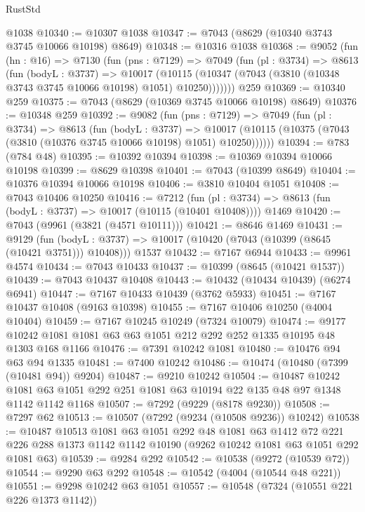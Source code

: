 \begin{lexlean}{RustStd}
\begin{coremodule}
    @1038
@10340 := @10307 @1038
@10347 := @7043 (@8629 (@10340 @3743 @3745 @10066 @10198) @8649)
@10348 := @10316 @1038
@10368 := @9052
    (fun (hn : @16) =>
    @7130
      (fun (pns : @7129) =>
      @7049
        (fun (pl : @3734) =>
        @8613
          (fun (bodyL : @3737) =>
          @10017
            (@10115 (@10347 (@7043 (@3810 (@10348 @3743 @3745 @10066 @10198) @1051) @10250)))))))
    @259
@10369 := @10340 @259
@10375 := @7043 (@8629 (@10369 @3745 @10066 @10198) @8649)
@10376 := @10348 @259
@10392 := @9082
    (fun (pns : @7129) =>
    @7049
      (fun (pl : @3734) =>
      @8613
        (fun (bodyL : @3737) =>
        @10017 (@10115 (@10375 (@7043 (@3810 (@10376 @3745 @10066 @10198) @1051) @10250))))))
@10394 := @783 (@784 @48)
@10395 := @10392 @10394
@10398 := @10369 @10394 @10066 @10198
@10399 := @8629 @10398
@10401 := @7043 (@10399 @8649)
@10404 := @10376 @10394 @10066 @10198
@10406 := @3810 @10404 @1051
@10408 := @7043 @10406 @10250
@10416 := @7212
    (fun (pl : @3734) => @8613 (fun (bodyL : @3737) => @10017 (@10115 (@10401 @10408))))
    @1469
@10420 := @7043 (@9961 (@3821 (@4571 @10111)))
@10421 := @8646 @1469
@10431 := @9129
    (fun (bodyL : @3737) => @10017 (@10420 (@7043 (@10399 (@8645 (@10421 @3751))) @10408)))
    @1537
@10432 := @7167 @6944
@10433 := @9961 @4574
@10434 := @7043 @10433
@10437 := @10399 (@8645 (@10421 @1537))
@10439 := @7043 @10437 @10408
@10443 := @10432 (@10434 @10439) (@6274 @6941)
@10447 := @7167 @10433 @10439 (@3762 @5933)
@10451 := @7167 @10437 @10408 (@9163 @10398)
@10455 := @7167 @10406 @10250 (@4004 @10404)
@10459 := @7167 @10245 @10249 (@7324 @10079)
@10474 := @9177 @10242 @1081 @1081 @63 @63 @1051 @212 @292 @252 @1335 @10195 @48 @1303 @168 @1166
@10476 := @7391 @10242 @1081
@10480 := @10476 @94 @63 @94 @1335
@10481 := @7400 @10242
@10486 := @10474 (@10480 (@7399 (@10481 @94)) @9204)
@10487 := @9210 @10242
@10504 := @10487
    @10242
    @1081
    @63
    @1051
    @292
    @251
    @1081
    @63
    @10194
    @22
    @135
    @48
    @97
    @1348
    @1142
    @1142
    @1168
@10507 := @7292 (@9229 (@8178 @9230))
@10508 := @7297 @62
@10513 := @10507 (@7292 (@9234 (@10508 @9236)) @10242)
@10538 := @10487
    @10513
    @1081
    @63
    @1051
    @292
    @48
    @1081
    @63
    @1412
    @72
    @221
    @226
    @288
    @1373
    @1142
    @1142
    @10190
    (@9262 @10242 @1081 @63 @1051 @292 @1081 @63)
@10539 := @9284 @292
@10542 := @10538 (@9272 (@10539 @72))
@10544 := @9290 @63 @292
@10548 := @10542 (@4004 (@10544 @48 @221))
@10551 := @9298 @10242 @63 @1051
@10557 := @10548 (@7324 (@10551 @221 @226 @1373 @1142))

\end{coremodule}
\end{lexlean}
